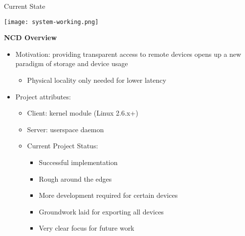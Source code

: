 \documentclass[handout]{beamer}
\begin{document}
\begin{frame}[c]{Current State}
  \begin{center}
    \texttt{[image: system-working.png]}
  \end{center}
\end{frame}

\begin{frame}{\bf NCD Overview}
  \begin{itemize}
    \item<1-> Motivation: providing transparent access to remote
      devices opens up a new paradigm of storage and device usage
    \begin{itemize}
      \item<2-> Physical locality only needed for lower latency
    \end{itemize}
    \item<3-> Project attributes:
    \begin{itemize}
      \item<4-> Client: kernel module (Linux 2.6.x+)
      \item<5-> Server: userspace daemon
      \item<6-> Current Project Status:
        \begin{itemize}
          \item<7-> Successful implementation
          \item<8-> Rough around the edges
          \item<9-> More development required for certain devices
          \item<10-> Groundwork laid for exporting all devices
          \item<11-> Very clear focus for future work
        \end{itemize}
      \end{itemize}
  \end{itemize}
\end{frame}
\end{document}
